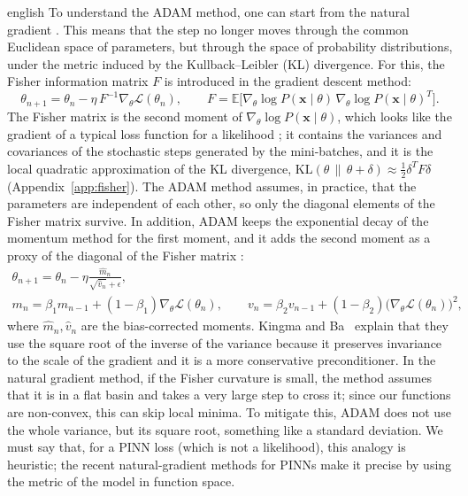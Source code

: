 \documentclass[11pt,letterpaper,twoside,openright]{book} %
\newcommand{\Loss}{\mathcal{L}}
\begin{document}
\begin{hyphenrules}{english}
To understand the ADAM method, one can start from the natural gradient
\cite{amari1998,pascanu2013}. This means that the step no longer moves through the common Euclidean
space of parameters, but through the space of probability distributions, under the metric induced by
the Kullback--Leibler (KL) divergence. For this, the Fisher information matrix $F$ is introduced in the
gradient descent method:
\begin{equation}
  \theta_{n+1}=\theta_n-\eta\,F^{-1}\nabla_\theta\Loss(\theta_n),\qquad
  F=\mathbb{E}\big[\nabla_\theta\log P(\mathbf{x}\mid\theta)\,\nabla_\theta\log P(\mathbf{x}\mid\theta)^{T}\big].
  \label{eq:natural-gradient}
\end{equation}
The Fisher matrix is the second moment of $\nabla_\theta\log P(\mathbf{x}\mid\theta)$, which looks like the
gradient of a typical loss function for a likelihood \cite{amari1998}; it contains the variances and
covariances of the stochastic steps generated by the mini-batches, and it is the local quadratic
approximation of the KL divergence, $\mathrm{KL}(\theta\,\|\,\theta+\delta)\approx\frac12\delta^{T}F\delta$
(Appendix~\ref{app:fisher}). The ADAM method assumes, in practice, that the parameters are independent of each
other, so only the diagonal elements of the Fisher matrix survive. In addition, ADAM keeps the exponential
decay of the momentum method \cite{ruder2016} for the first moment, and it adds the second moment as
a proxy of the diagonal of the Fisher matrix \cite{kingma2015}:
\begin{equation}
  \begin{gathered}
  \theta_{n+1}=\theta_n-\eta\frac{\hat m_n}{\sqrt{\hat v_n}+\epsilon},\\
  m_n=\beta_1m_{n-1}+(1-\beta_1)\nabla_\theta\Loss(\theta_n),\qquad
  v_n=\beta_2v_{n-1}+(1-\beta_2)\big(\nabla_\theta\Loss(\theta_n)\big)^2,
  \end{gathered}
  \label{eq:adam}
\end{equation}
where $\hat m_n,\hat v_n$ are the bias-corrected moments. Kingma and Ba~\cite{kingma2015} explain that they use the
square root of the inverse of the variance because it preserves invariance to the scale of the gradient
and it is a more conservative preconditioner. In the natural gradient method, if the Fisher curvature is
small, the method assumes that it is in a flat basin and takes a very large step to cross it; since our
functions are non-convex, this can skip local minima. To mitigate this, ADAM does not use the whole
variance, but its square root, something like a standard deviation. We must say that, for a PINN loss
(which is not a likelihood), this analogy is heuristic; the recent natural-gradient methods for PINNs
\cite{schwencke2025anagram,schwencke2025thesis} make it precise by using the metric of the model in
function space.


\end{hyphenrules}
\end{document}
